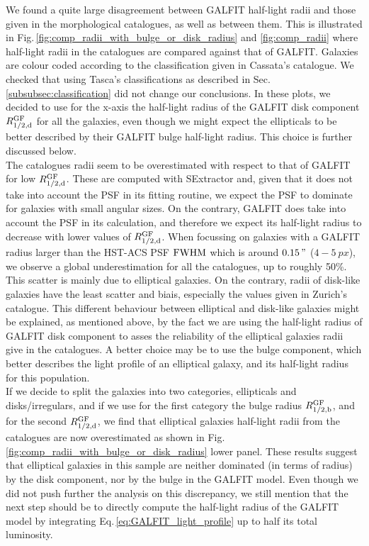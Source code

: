 We found a quite large disagreement between GALFIT half-light radii and those given in the morphological catalogues, as well as between them. This is illustrated in Fig.\,\ref{fig:comp_radii_with_bulge_or_disk_radius} and \ref{fig:comp_radii} where half-light radii in the catalogues are compared against that of GALFIT. Galaxies are colour coded according to the classification given in Cassata's catalogue. We checked that using Tasca's classifications as described in Sec.\,\ref{subsubsec:classification} did not change our conclusions. In these plots, we decided to use for the x-axis the half-light radius of the GALFIT disk component $R_{1/2 , \rm{d}}^{\rm{GF}}$ for all the galaxies, even though we might expect the ellipticals to be better described by their GALFIT bulge half-light radius. This choice is further discussed below.\\

The catalogues radii seem to be overestimated with respect to that of GALFIT for low $R_{1/2 , \rm{d}}^{\rm{GF}}$. These are computed with SExtractor and, given that it does not take into account the PSF in its fitting routine, we expect the PSF to dominate for galaxies with small angular sizes. On the contrary, GALFIT does take into account the PSF in its calculation, and therefore we expect its half-light radius to decrease with lower values of $R_{1/2 , \rm{d}}^{\rm{GF}}$. When focussing on galaxies with a GALFIT radius larger than the HST-ACS PSF $\rm{FWHM}$ which is around $\SI{0.15}{"}$ ($4 - \SI{5}{px}$), we observe a global underestimation for all the catalogues, up to roughly 50\%. This scatter is mainly due to elliptical galaxies. On the contrary, radii of disk-like galaxies have the least scatter and biais, especially the values given in Zurich's catalogue. This different behaviour between elliptical and disk-like galaxies might be explained, as mentioned above, by the fact we are using the half-light radius of GALFIT disk component to asses the reliability of the elliptical galaxies radii give in the catalogues. A better choice may be to use the bulge component, which better describes the light profile of an elliptical galaxy, and its half-light radius for this population.\\

If we decide to split the galaxies into two categories, ellipticals and disks/irregulars, and if we use for the first category the bulge radius $R_{1/2 , \rm{b}}^{\rm{GF}}$, and for the second $R_{1/2 , \rm{d}}^{\rm{GF}}$, we find that elliptical galaxies half-light radii from the catalogues are now overestimated as shown in Fig.\,\ref{fig:comp_radii_with_bulge_or_disk_radius} lower panel. These results suggest that elliptical galaxies in this sample are neither dominated (in terms of radius) by the disk component, nor by the bulge in the GALFIT model. Even though we did not push further the analysis on this discrepancy, we still mention that the next step should be to directly compute the half-light radius of the GALFIT model by integrating Eq.\,\ref{eq:GALFIT_light_profile} up to half its total luminosity.


